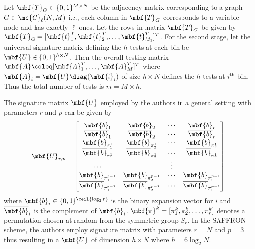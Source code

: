 \documentclass[conference,twocolumn]{IEEEtran}
\begin{document}
 Let $\mbf{T}_{G}\in\{0,1\}^{M\times N }$ be the adjacency matrix corresponding to a graph $G\in\mc{G}_{\ell}(N,M)$ i.e., each column in $\mbf{T}_{G}$ corresponds to a variable node and has exactly $\ell$ ones. Let the rows in matrix $\mbf{T}_{G}$ be given by $\mbf{T}_{G}=[\mbf{t}^{T}_1,\mbf{t}^{T}_{2},\dots, \mbf{t}^{T}_{M_1}]^{T}$. For the second stage, let the universal signature matrix defining the $h$ tests at each bin be $\mbf{U}\in\{0,1\}^{h\times N}$. Then the overall testing matrix $\mbf{A}\coleq [\mbf{A}_{1}^{T},\ldots,\mbf{A}_{M}^{T}]^T$ where $\mbf{A}_{i}=\mbf{U} \diag (\mbf{t}_i)$ of size $h\times N$ defines the $h$ tests at $i^{\text{th}}$ bin. Thus the total number of tests is $m=M\times h$.


The signature matrix $\mbf{U}$ employed by the authors in a general setting with parameters $r$ and $p$ can be given by
 \begin{align}
\label{Eqn:SignatureMatrix}
\mbf{U}_{r,p}=\begin{bmatrix}
\mbf{b}_1  & \mbf{b}_2 &\cdots & \mbf{b}_r \\
\overline{\mbf{b}}_1 & \overline{\mbf{b}}_2 & \cdots & \overline{\mbf{b}}_r\\
\mbf{b}_{\pi^{1}_{1}} & \mbf{b}_{\pi^{1}_{2}} & \cdots & \mbf{b}_{\pi^{1}_{r}}\\
\overline{\mbf{b}}_{\pi^{1}_{1}} & \overline{\mbf{b}}_{\pi^{1}_{2}} & \cdots & \overline{\mbf{b}}_{\pi^{1}_{r}}\\
\cdots &  &\vdots \\
\mbf{b}_{\pi^{p-1}_{1}} & \mbf{b}_{\pi^{p-1}_{2}} & \cdots & \mbf{b}_{\pi^{p-1}_{r}}\\
\overline{\mbf{b}}_{\pi^{p-1}_{1}} & \overline{\mbf{b}}_{\pi^{p-1}_{2}} & \cdots & \overline{\mbf{b}}_{\pi^{p-1}_{r}}
\end{bmatrix}
\end{align}
where $\mbf{b}_{i}\in\{0,1\}^{\ceil{\log_{2}r}}$ is the binary expansion vector for $i$ and $\overline{\mbf{b}}_{i}$ is the complement of $\mbf{b}_{i}$. $\mbf{\pi}^{k}=[\pi^{k}_1,\pi^{k}_2,\ldots,\pi^{k}_r]$ denotes a permutation chosen at random from the symmetric group $S_{r}$. In the SAFFRON scheme, the authors employ signature matrix with parameters $r=N$ and $p=3$ thus resulting in a $\mbf{U}$ of dimension $h \times N$ where $h=6\log_{2}N$.
\end{document}
